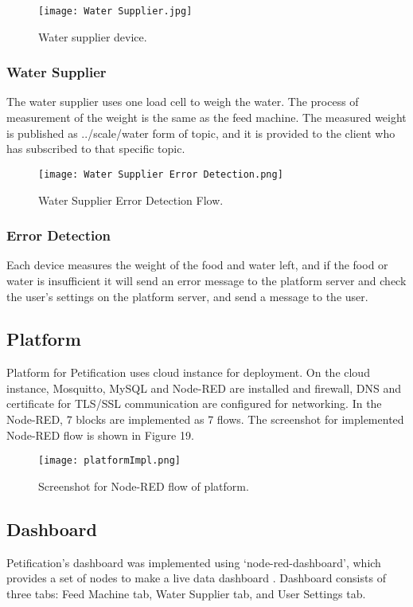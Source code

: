 \documentclass[conference]{IEEEtran}
\begin{document}
\begin{figure}[htbp]
\centerline{\texttt{[image: Water Supplier.jpg]}}
\caption{Water supplier device.}
\label{fig}
\end{figure}


\subsubsection{Water Supplier}
The water supplier uses one load cell to weigh the water. The process of measurement of the
weight is the same as the feed machine. The measured weight is published as ../scale/water form
of topic, and it is provided to the client who has subscribed to that specific topic.

\begin{figure}[htbp]
\centerline{\texttt{[image: Water Supplier Error Detection.png]}}
\caption{Water Supplier Error Detection Flow.}
\label{fig}
\end{figure}

\subsubsection{Error Detection}
Each device measures the weight of the food and water left, and if the food or water is
insufficient it will send an error message to the platform server and check the user’s settings on
the platform server, and send a message to the user.

\subsection{Platform}
Platform for Petification uses cloud instance for deployment. On the cloud instance, Mosquitto, MySQL and Node-RED are installed and firewall, DNS and certificate for TLS/SSL communication are configured for networking. In the Node-RED, 7 blocks are implemented as 7 flows. The screenshot for implemented Node-RED flow is shown in Figure 19.

\begin{figure}[htbp]
\centerline{\texttt{[image: platformImpl.png]}}
\caption{Screenshot for Node-RED flow of platform.}
\label{fig}
\end{figure}

\subsection{Dashboard}
Petification’s dashboard was implemented using ‘node-red-dashboard’, which provides a set of nodes to make a live data dashboard \cite{b19}.
Dashboard consists of three tabs: Feed Machine tab, Water Supplier tab, and User Settings tab. \\
\end{document}
